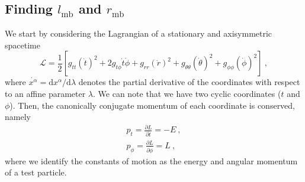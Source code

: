\documentclass[twocolumn,aps,showpacs,showkeys,prd,superscriptaddress,byrevtex, amsmath]{revtex4-1}
\begin{document}
\begin{appendix}

\section{Finding $l_{\mathrm{mb}}$ and $r_{\mathrm{mb}}$}
\label{ang_mom_appendix}

We start by considering the Lagrangian of a stationary and axisymmetric spacetime
\begin{equation}
\mathcal{L} = \frac{1}{2}\left[g_{tt} (\dot{t})^2 + 2 g_{t\phi} \dot{t}\dot{\phi} + g_{rr} (\dot{r})^2 + g_{\theta\theta} (\dot{\theta})^2 + g_{\phi\phi} (\dot{\phi})^2\right]\ ,
\end{equation}
where $\dot{x^{\alpha}} = \mathrm{d}x^{\alpha}/\mathrm{d}\lambda$ denotes the partial derivative of the coordinates with respect to an affine parameter $\lambda$. We can note that we have two cyclic coordinates ($t$ and $\phi$). Then, the canonically conjugate momentum of each coordinate is conserved, namely
\begin{eqnarray}\label{eq:momenta}
p_t = \frac{\partial L}{\partial \dot{t}} = -E \ ,
\\
p_{\phi} = \frac{\partial L}{\partial \dot{\phi}} = L\ ,
\end{eqnarray}
where we identify the constants of motion as the energy and angular momentum of a test particle.


\end{appendix}
\end{document}
